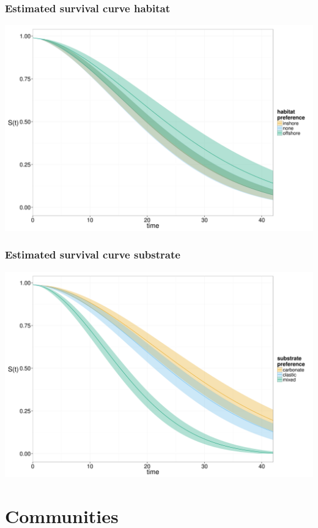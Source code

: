 \documentclass{beamer}
\begin{document}
\begin{frame}
  \frametitle{Estimated survival curve habitat}
  \begin{center}
    \includegraphics[height = 0.8\textheight, width = \textwidth, keepaspectratio = true]{figure/hab}
  \end{center}
\end{frame}

\begin{frame}
  \frametitle{Estimated survival curve substrate}
  \begin{center}
    \includegraphics[height = 0.8\textheight, width = \textwidth, keepaspectratio = true]{figure/aff}
  \end{center}
\end{frame}


\section{Communities}
\end{document}
